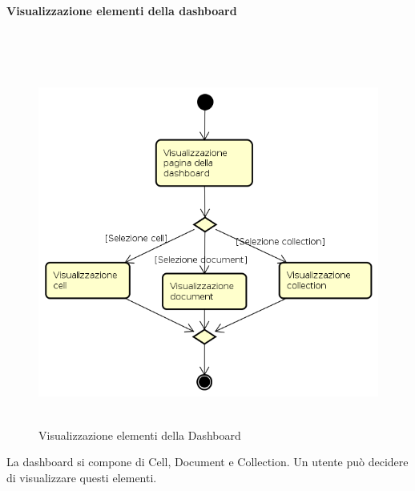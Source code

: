 \paragraph{Visualizzazione elementi della dashboard} \mbox{} \\
\begin{figure}[H]
\begin{center}
\includegraphics[height=12cm]{res/sections/backend/activities/visualizzazioneElementDashboard.png}
\caption{Visualizzazione elementi della Dashboard}
\end{center}
\end{figure}
La dashboard si compone di Cell, Document e Collection. Un utente può decidere di visualizzare questi elementi.
